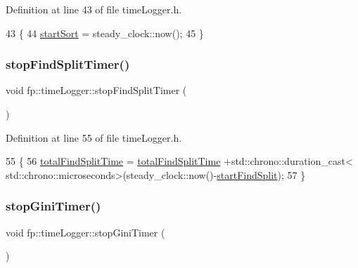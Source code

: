 Definition at line 43 of file time\+Logger.\+h.


\begin{DoxyCode}
43                             \{
44 \hyperlink{classfp_1_1timeLogger_afed53c702d6f414558eb7ca49f37ff22}{startSort} = steady\_clock::now();
45                 \}
\end{DoxyCode}
\mbox{\label{classfp_1_1timeLogger_a99c7751d29c3a180fca00564089b9de7}} 
\subsubsection{\texorpdfstring{stop\+Find\+Split\+Timer()}{stopFindSplitTimer()}}
{\footnotesize\ttfamily void fp\+::time\+Logger\+::stop\+Find\+Split\+Timer (\begin{DoxyParamCaption}{ }\end{DoxyParamCaption})\hspace{0.3cm}{\ttfamily [inline]}}



Definition at line 55 of file time\+Logger.\+h.


\begin{DoxyCode}
55                                                 \{
56 \hyperlink{classfp_1_1timeLogger_a11998b4bff9e1f548f4468e25f79a6f2}{totalFindSplitTime} = \hyperlink{classfp_1_1timeLogger_a11998b4bff9e1f548f4468e25f79a6f2}{totalFindSplitTime} +std::chrono::duration\_cast<
      std::chrono::microseconds>(steady\_clock::now()-\hyperlink{classfp_1_1timeLogger_a1783656ae0d2e107cdfa87766ddc1a8c}{startFindSplit});
57                 \}
\end{DoxyCode}
\mbox{\label{classfp_1_1timeLogger_ad5a58f08214d4d48b4740685506c130f}} 
\subsubsection{\texorpdfstring{stop\+Gini\+Timer()}{stopGiniTimer()}}
{\footnotesize\ttfamily void fp\+::time\+Logger\+::stop\+Gini\+Timer (\begin{DoxyParamCaption}{ }\end{DoxyParamCaption})\hspace{0.3cm}{\ttfamily [inline]}}



